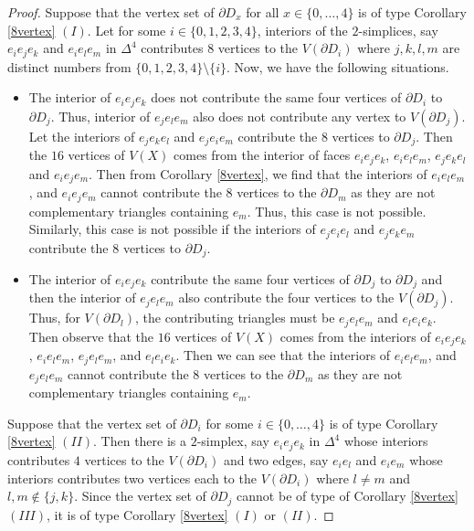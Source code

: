 \documentclass[10pt,a4paper]{amsart}
\newcommand{\D}{\Delta}
\begin{document}
\begin{proof}
Suppose that the vertex set of $\partial D_x$ for all $x\in\{0,\ldots,4\}$ is of type Corollary \ref{8vertex} $(I)$. Let for some $i\in\{0,1,2,3,4\}$, interiors of the  $2$-simplices, say $e_ie_je_k$ and $e_ie_le_m$ in $\D^4$   contributes $8$ vertices to the $V(\partial D_i)$ where $j,k,l,m$ are distinct numbers from $\{0,1,2,3,4\}\setminus \{i\}$. Now, we have the following situations.

\begin{itemize}
    \item The interior of $e_ie_je_k$  does not contribute the same four vertices of $\partial D_i$ to $\partial D_j$. Thus, interior of $e_je_le_m$   also does not contribute any vertex to $V(\partial D_j)$. Let the interiors of $e_je_ke_l$ and $e_je_ie_m$ contribute the $8$ vertices to $\partial D_j$. Then the $16$ vertices of $V(X)$ comes from the interior of faces $e_ie_je_k$, $e_ie_le_m$, $e_je_ke_l$ and $e_ie_je_m$. Then from Corollary \ref{8vertex}, we find that the interiors of $e_ie_le_m$,  and $e_ie_je_m$ cannot contribute the $8$ vertices to the $\partial D_m$ as they are not complementary triangles containing $e_m$. Thus, this case is not possible. Similarly, this case is not possible if the interiors of $e_je_ie_l$ and $e_je_ke_m$ contribute the $8$ vertices to $\partial D_j$.
    
   \item The interior of $e_ie_je_k$ contribute the same four vertices of $\partial D_j$ to $\partial D_j$ and then the interior of $e_je_le_m$ also contribute the four vertices to the $V(\partial D_j)$. Thus, for $V(\partial D_l)$, the contributing triangles must be $e_je_le_m$ and $e_le_ie_k$. Then observe that the $16$ vertices of $V(X)$ comes from the interiors of $e_ie_je_k$, $e_ie_le_m$, $e_je_le_m$, and $e_le_ie_k$. Then we can see that the interiors of $e_ie_le_m$,  and $e_je_le_m$ cannot contribute the $8$ vertices to the $\partial D_m$ as they are not complementary triangles containing $e_m$.    
\end{itemize}

Suppose that the vertex set of $\partial D_i$ for some $i\in\{0,\ldots,4\}$ is of type Corollary \ref{8vertex} $(II)$. Then there is a $2$-simplex, say $e_ie_je_k$ in $\D^4$  whose interiors contributes $4$ vertices to the $V(\partial D_i)$ and two edges, say $e_ie_l$ and $e_ie_m$ whose interiors contributes two vertices each to the  $V(\partial D_i)$ where $l\neq m$ and $l,m\notin\{j,k\}$. Since the vertex set of $\partial D_j$ cannot be of type of Corollary \ref{8vertex} $(III)$, it is of type Corollary \ref{8vertex} $(I)$ or $(II)$. 


\end{proof}
\end{document}
